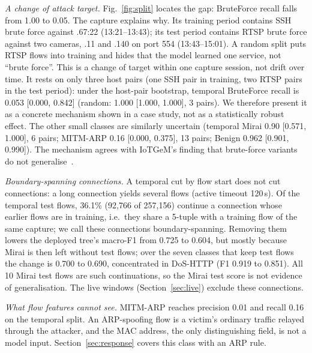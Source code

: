 \emph{A change of attack target.} Fig.~\ref{fig:split} locates the gap: BruteForce recall falls from 1.00 to 0.05. The capture explains why. Its training period contains SSH brute force against .67:22 (13:21--13:43); its test period contains RTSP brute force against two cameras, .11 and .140 on port 554 (13:43--15:01). A random split puts RTSP flows into training and hides that the model learned one service, not ``brute force''. This is a change of target within one capture session, not drift over time. It rests on only three host pairs (one SSH pair in training, two RTSP pairs in the test period): under the host-pair bootstrap, temporal BruteForce recall is 0.053 [0.000, 0.842] (random: 1.000 [1.000, 1.000], 3 pairs). We therefore present it as a concrete mechanism shown in a case study, not as a statistically robust effect. The other small classes are similarly uncertain (temporal Mirai 0.90 [0.571, 1.000], 6 pairs; MITM-ARP 0.16 [0.000, 0.375], 13 pairs; Benign 0.962 [0.901, 0.990]). The mechanism agrees with IoTGeM's finding that brute-force variants do not generalise~\cite{kostas2024iotgem}.

\emph{Boundary-spanning connections.} A temporal cut by flow start does not cut connections: a long connection yields several flows (active timeout 120\,s). Of the temporal test flows, 36.1\% (92,766 of 257,156) continue a connection whose earlier flows are in training, i.e.\ they share a 5-tuple with a training flow of the same capture; we call these connections boundary-spanning. Removing them lowers the deployed tree's macro-F1 from 0.725 to 0.604, but mostly because Mirai is then left without test flows; over the seven classes that keep test flows the change is 0.700 to 0.690, concentrated in DoS-HTTP (F1 0.919 to 0.851). All 10 Mirai test flows are such continuations, so the Mirai test score is not evidence of generalisation. The live windows (Section~\ref{sec:live}) exclude these connections.

\emph{What flow features cannot see.} MITM-ARP reaches precision 0.01 and recall 0.16 on the temporal split. An ARP-spoofing flow is a victim's ordinary traffic relayed through the attacker, and the MAC address, the only distinguishing field, is not a model input. Section~\ref{sec:response} covers this class with an ARP rule.
